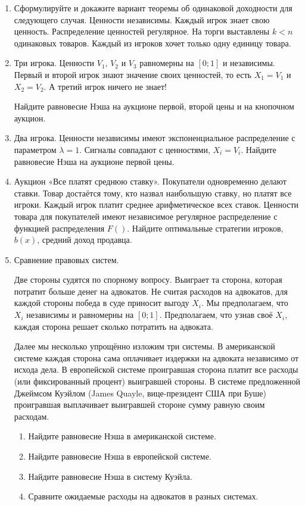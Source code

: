 \begin{enumerate}

\item Сформулируйте и докажите вариант теоремы об одинаковой доходности для следующего случая. Ценности независимы. Каждый игрок знает свою ценность. Распределение ценностей регулярное. На торги выставлены $ k<n $ одинаковых товаров. Каждый из игроков хочет только одну единицу товара.

\item Три игрока. Ценности $ V_{1} $, $ V_{2} $ и $ V_{3} $ равномерны на $ [0;1] $ и независимы. Первый и второй игрок знают значение своих ценностей, то есть $ X_{1}=V_{1} $ и $ X_{2}=V_{2} $. А третий игрок ничего не знает!

Найдите равновесие Нэша на аукционе первой, второй цены и на кнопочном аукцион.


\item Два игрока. Ценности независимы имеют экспоненциальное распределение с параметром $ \lambda=1 $. Сигналы совпадают с ценностями,  $ X_{i}=V_{i} $. Найдите равновесие Нэша на аукционе первой цены.




\item Аукцион «Все платят среднюю ставку». Покупатели одновременно делают ставки. Товар достаётся тому, кто назвал наибольшую ставку, но платят все игроки. Каждый игрок платит среднее арифметическое всех ставок. Ценности товара для покупателей имеют независимое регулярное распределение с функцией распределения $ F() $. Найдите оптимальные стратегии игроков, $ b(x) $, средний доход продавца.



\item Сравнение правовых систем.

Две стороны судятся по спорному вопросу. Выиграет та сторона, которая потратит больше денег на адвокатов. Не считая расходов на адвокатов, для каждой стороны победа в суде приносит выгоду $ X_{i} $. Мы предполагаем, что $ X_{i} $ независимы и равномерны на $ [0;1] $. Предполагаем, что узнав своё $ X_{i} $, каждая сторона решает сколько потратить на адвоката.

Далее мы несколько упрощённо изложим три системы. В американской системе каждая сторона сама оплачивает издержки на адвоката независимо от исхода дела. В европейской системе проигравшая сторона платит все расходы (или фиксированный процент) выигравшей стороны. В системе предложенной Джеймсом Куэйлом (James Quayle, вице-президент США при Буше) проигравшая выплачивает выигравшей стороне сумму равную своим расходам.
\begin{enumerate}
\item Найдите равновесие Нэша в американской системе.
\item Найдите равновесие Нэша в европейской системе.
\item Найдите равновесие Нэша в систему Куэйла.
\item Сравните ожидаемые расходы на адвокатов в разных системах.
\end{enumerate}



\end{enumerate}
